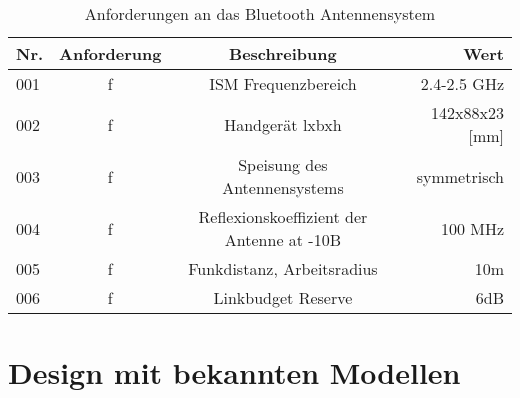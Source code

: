 
\begin{table}[!ht]
\centering
\begin{tabular}{lccr} \toprule 
Nr. & Anforderung & Beschreibung & Wert   \\ 
\midrule
001 & f & ISM Frequenzbereich  & 2.4-2.5 GHz  \\ 
002 & f & Handgerät lxbxh & 142x88x23 [mm]    \\  
003 & f &  Speisung des Antennensystems & symmetrisch  \\  
004 & f & Reflexionskoeffizient der Antenne  at -10B & 100 MHz  \\ 
005 & f & Funkdistanz, Arbeitsradius & 10m   \\ 
006 & f & Linkbudget Reserve & 6dB   \\ 
\bottomrule
  \end{tabular}
  \caption{Anforderungen an das Bluetooth Antennensystem}
  \label{AnforderungenAntenneSystem}
\end{table} 

\section{Design mit bekannten Modellen}

